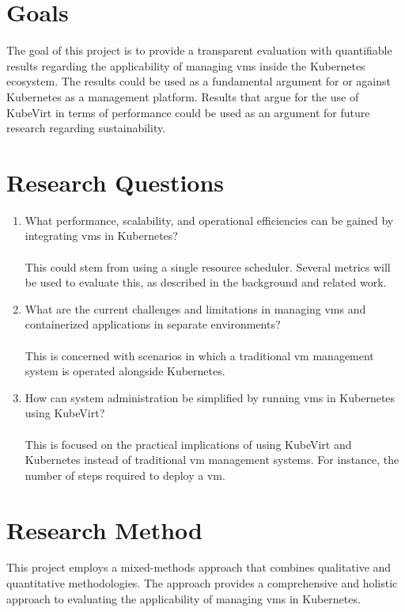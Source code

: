 \documentclass{kththesis}
\begin{document}
\section{Goals}
The goal of this project is to provide a transparent evaluation with quantifiable results regarding the applicability of managing \Glspl{vm} inside the Kubernetes ecosystem. The results could be used as a fundamental argument for or against Kubernetes as a management platform. Results that argue for the use of KubeVirt in terms of performance could be used as an argument for future research regarding sustainability.

\section{Research Questions}
\begin{enumerate}
    \item What performance, scalability, and operational efficiencies can be gained by integrating \Glspl{vm} in Kubernetes?
    \\\\
    This could stem from using a single resource scheduler. Several metrics will be used to evaluate this, as described in the background and related work.

    \item What are the current challenges and limitations in managing \Glspl{vm} and containerized applications in separate environments?
    \\\\
    This is concerned with scenarios in which a traditional \Gls{vm} management system is operated alongside Kubernetes.

    \item How can system administration be simplified by running \Glspl{vm} in Kubernetes using KubeVirt?
    \\\\
    This is focused on the practical implications of using KubeVirt and Kubernetes instead of traditional \Gls{vm} management systems. For instance, the number of steps required to deploy a \Gls{vm}.
\end{enumerate}

\section{Research Method}
This project employs a mixed-methods approach that combines qualitative and quantitative methodologies. The approach provides a comprehensive and holistic approach to evaluating the applicability of managing \Glspl{vm} in Kubernetes.
\end{document}
